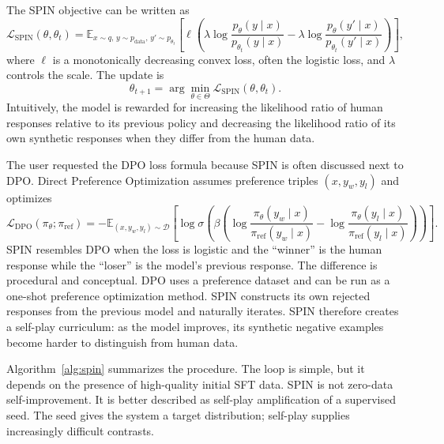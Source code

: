 The SPIN objective can be written as
\begin{equation}
    \mathcal{L}_{\mathrm{SPIN}}(\theta,\theta_t)
    = \mathbb{E}_{x\sim q,\,y\sim p_{\mathrm{data}},\,y'\sim p_{\theta_t}}
    \left[\ell\left(\lambda \log \frac{p_\theta(y\mid x)}{p_{\theta_t}(y\mid x)}
    -\lambda \log \frac{p_\theta(y'\mid x)}{p_{\theta_t}(y'\mid x)}\right)\right],
    \label{eq:spin-loss}
\end{equation}
where $\ell$ is a monotonically decreasing convex loss, often the logistic loss, and $\lambda$ controls the scale. The update is
\begin{equation}
    \theta_{t+1}=\arg\min_{\theta\in\Theta}\mathcal{L}_{\mathrm{SPIN}}(\theta,\theta_t).
\end{equation}
Intuitively, the model is rewarded for increasing the likelihood ratio of human responses relative to its previous policy and decreasing the likelihood ratio of its own synthetic responses when they differ from the human data.

The user requested the DPO loss formula because SPIN is often discussed next to DPO. Direct Preference Optimization assumes preference triples $(x,y_w,y_l)$ and optimizes
\begin{equation}
    \mathcal{L}_{\mathrm{DPO}}(\pi_\theta;\pi_{\mathrm{ref}})
    = -\mathbb{E}_{(x,y_w,y_l)\sim\mathcal{D}}
    \left[\log \sigma\left(\beta\left(
    \log\frac{\pi_\theta(y_w\mid x)}{\pi_{\mathrm{ref}}(y_w\mid x)}
    -\log\frac{\pi_\theta(y_l\mid x)}{\pi_{\mathrm{ref}}(y_l\mid x)}
    \right)\right)\right].
    \label{eq:dpo-loss}
\end{equation}
SPIN resembles DPO when the loss is logistic and the ``winner'' is the human response while the ``loser'' is the model's previous response. The difference is procedural and conceptual. DPO uses a preference dataset and can be run as a one-shot preference optimization method. SPIN constructs its own rejected responses from the previous model and naturally iterates. SPIN therefore creates a self-play curriculum: as the model improves, its synthetic negative examples become harder to distinguish from human data.

Algorithm~\ref{alg:spin} summarizes the procedure. The loop is simple, but it depends on the presence of high-quality initial SFT data. SPIN is not zero-data self-improvement. It is better described as self-play amplification of a supervised seed. The seed gives the system a target distribution; self-play supplies increasingly difficult contrasts.


